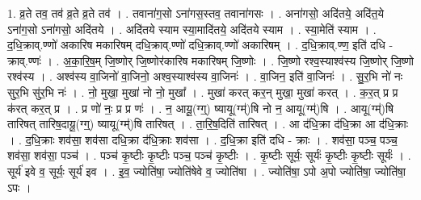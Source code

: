 \documentclass[17pt]{extarticle}
\begin{document}
1. व्र॒ते तव॒ तव॑ व्र॒ते व्र॒ते तव॑ । . तवाना॑ग॒सो ऽना॑गस॒स्तव॒ तवाना॑गसः । . अना॑गसो॒ अदि॑तये॒ अदि॑त॒ये ऽना॑ग॒सो ऽना॑गसो॒ अदि॑तये । . अदि॑तये स्याम स्या॒मादि॑तये॒ अदि॑तये स्याम । . स्या॒मेति॑ स्याम । . द॒धि॒क्राव्.ण्णो॑ अकारिष मकारिषम् दधि॒क्राव्.ण्णो॑ दधि॒क्राव्.ण्णो॑ अकारिषम् । . द॒धि॒क्राव्.ण्ण॒ इति॑ दधि - क्राव्.ण्णः॑ । . अ॒का॒रि॒ष॒म् जि॒ष्णोर् जि॒ष्णोर॑कारिष मकारिषम् जि॒ष्णोः । . जि॒ष्णो रश्व॒स्याश्व॑स्य जि॒ष्णोर् जि॒ष्णो रश्व॑स्य । . अश्व॑स्य वा॒जिनो॑ वा॒जिनो॒ अश्व॒स्याश्व॑स्य वा॒जिनः॑ । . वा॒जिन॒ इति॑ वा॒जिनः॑ । . सु॒र॒भि नो॑ नः सुर॒भि सु॑र॒भि नः॑ । . नो॒ मुखा॒ मुखा॑ नो नो॒ मुखा᳚ । . मुखा॑ करत् कर॒न् मुखा॒ मुखा॑ करत् । . क॒र॒त् प्र प्र क॑रत् कर॒त् प्र । . प्र णो॑ नः॒ प्र प्र णः॑ । . न॒ आयू॒(ग्ग्॒) ष्यायू(ग्म्॑)षि नो न॒ आयू(ग्म्॑)षि । . आयू(ग्म्॑)षि तारिषत् तारिष॒दायू॒(ग्ग्॒) ष्यायू(ग्म्॑)षि तारिषत् । . ता॒रि॒ष॒दिति॑ तारिषत् । . आ द॑धि॒क्रा द॑धि॒क्रा आ द॑धि॒क्राः । . द॒धि॒क्राः शव॑सा॒ शव॑सा दधि॒क्रा द॑धि॒क्राः शव॑सा । . द॒धि॒क्रा इति॑ दधि - क्राः । . शव॑सा॒ पञ्च॒ पञ्च॒ शव॑सा॒ शव॑सा॒ पञ्च॑ । . पञ्च॑ कृ॒ष्टीः कृ॒ष्टीः पञ्च॒ पञ्च॑ कृ॒ष्टीः । . कृ॒ष्टीः सूर्यः॒ सूर्यः॑ कृ॒ष्टीः कृ॒ष्टीः सूर्यः॑ । . सूर्य॑ इवे व॒ सूर्यः॒ सूर्य॑ इव । . इ॒व॒ ज्योति॑षा॒ ज्योति॑षेवे व॒ ज्योति॑षा । . ज्योति॑षा॒ ऽपो अ॒पो ज्योति॑षा॒ ज्योति॑षा॒ ऽपः । \newline
\end{document}

